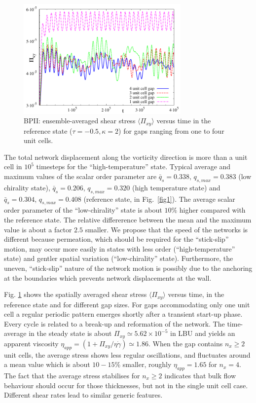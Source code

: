 \documentclass[12pt,twoside]{iopart}
\newcommand{\ex}[1]{\times10^{#1}}
\begin{document}
\begin{figure}[t]
\centering
\includegraphics[width=0.75\textwidth]{stress_bp2_fbc.pdf}
\caption{BPII: ensemble-averaged shear stress $\langle \Pi_{xy}\rangle$
versus time in the reference state ($\tau=-0.5, \kappa=2$) for gaps ranging
from one to four unit cells.}
\label{fig3}
\end{figure}

The total network displacement along the vorticity direction is more than
a unit cell in $10^5$ timesteps for the ``high-temperature'' state.
Typical average and maximum values of the scalar order parameter are
$\bar{q}_s=0.338$, $q_{s,max}=0.383$ (low chirality state), 
$\bar{q}_s=0.206$, $q_{s,max}=0.320$ (high temperature state) and
$\bar{q}_s=0.304$, $q_{s,max}=0.408$ (reference state, in Fig.~\ref{fig1}).
The average scalar order parameter of the ``low-chirality'' state is about
$10\%$ higher compared with the reference state. The  relative differerence
between the mean and the maximum value is about a factor $2.5$ smaller.
We propose that the speed of the networks is different because permeation, which should be required for the ``stick-slip'' motion, may occur more easily in states with less order (``high-temperature'' state) and gentler spatial variation (``low-chirality'' state). Furthermore, the uneven, ``stick-slip'' nature of the network motion is possibly due to the anchoring at the boundaries which prevents network displacements at the wall. 

Fig. \ref{fig3} shows the spatially averaged shear stress $\langle \Pi_{xy}\rangle$ versus time, in the reference state and for different gap sizes.
For gaps accommodating only one unit cell a regular periodic pattern emerges shortly after a transient start-up phase.
Every cycle is related to a break-up and reformation of the network.
The time-average in the steady state is about $\Pi_{xy}\simeq5.62\ex{-5}$ in LBU and yields an apparent viscosity $\eta_{app}=(1 +\Pi_{xy}/\eta\dot{\gamma})\simeq 1.86$. 
When the gap contains $n_x\ge2$ unit cells, the average stress shows less regular oscillations, and fluctuates around a mean value which is about $10-15\%$ smaller, roughly $\eta_{app}=1.65$ for $n_x=4$. The fact that the average stress stabilises for $n_x\ge2$ indicates that bulk flow behaviour should occur for those thicknesses, but not in the single unit cell case.
Different shear rates lead to similar generic features.
\end{document}
